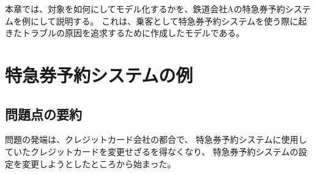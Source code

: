 本章では、対象を如何にしてモデル化するかを、鉄道会社Aの特急券予約システムを例にして説明する。
これは、乗客として特急券予約システムを使う際に起きたトラブルの原因を追求するために作成したモデルである。

\section {特急券予約システムの例}

\subsection{問題点の要約}

問題の発端は、クレジットカード会社の都合で、
特急券予約システムに使用していたクレジットカードを変更せざるを得なくなり、
特急券予約システムの設定を変更しようとしたところから始まった。

